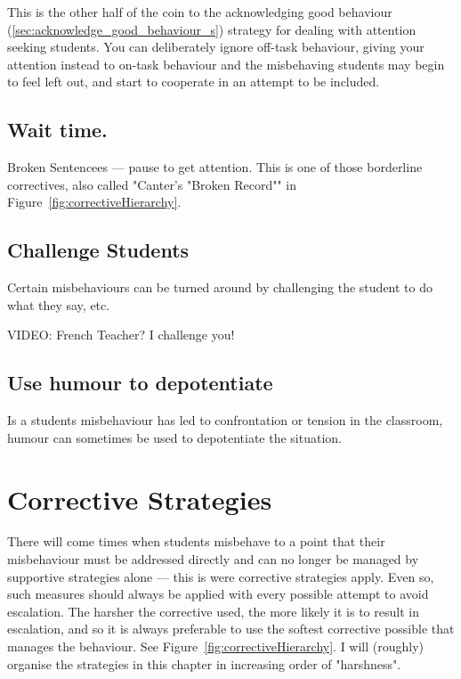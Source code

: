 \documentclass[12pt]{report}
\begin{document}
This is the other half of the coin to the acknowledging good behaviour (\ref{sec:acknowledge_good_behaviour_s}) strategy for dealing with attention seeking students. You can deliberately ignore off-task behaviour, giving your attention instead to on-task behaviour and the misbehaving students may begin to feel left out, and start to cooperate in an attempt to be included.



\section{Wait time.}
\label{sec:wait_time_s}

Broken Sentencees --- pause to get attention. This is one of those borderline correctives, also called "Canter's "Broken Record"" in Figure~\ref{fig:correctiveHierarchy}.


\section{Challenge Students}
\label{sec:challenge_s}

Certain misbehaviours can be turned around by challenging the student to do what they say, etc. 

VIDEO: French Teacher? I challenge you! 

\section{Use humour to depotentiate}
\label{sec:humour_s}

Is a students misbehaviour has led to confrontation or tension in the classroom, humour can sometimes be used to depotentiate the situation.

























\chapter{Corrective Strategies}
\label{chap:corrective}

There will come times when students misbehave to a point that their misbehaviour must be addressed directly and can no longer be managed by supportive strategies alone --- this is were corrective strategies apply. Even so, such measures should always be applied with every possible attempt to avoid escalation. The harsher the corrective used, the more likely it is to result in escalation, and so it is always preferable to use the softest corrective possible that manages the behaviour. See Figure~\ref{fig:correctiveHierarchy}. I will (roughly) organise the strategies in this chapter in increasing order of "harshness".
\end{document}
